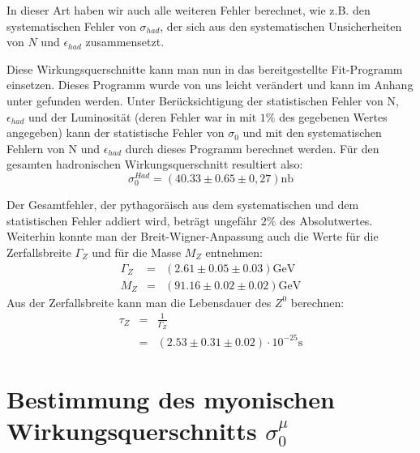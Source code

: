 In dieser Art haben wir auch alle weiteren Fehler berechnet, wie z.B. den systematischen Fehler von $\sigma_{had}$, der sich aus den systematischen Unsicherheiten von $N$ und $\epsilon_{had}$ zusammensetzt.

Diese Wirkungsquerschnitte kann man nun in das bereitgestellte Fit-Programm einsetzen. Dieses Programm wurde von uns leicht verändert und kann im Anhang unter  gefunden werden. Unter Berücksichtigung der statistischen Fehler von N, $\epsilon_{had}$ und der Luminosität (deren Fehler war in \cite[S.9]{script} mit $1\%$ des gegebenen Wertes angegeben) kann der statistische Fehler von $\sigma_0$ und mit den systematischen Fehlern von N und $\epsilon_{had}$ durch dieses Programm berechnet werden. Für den gesamten hadronischen Wirkungsquerschnitt resultiert also:
\begin{equation}
\sigma_0^{Had} = (40.33 \pm 0.65 \pm 0,27)\si{\nano\barn}
\end{equation}

Der Gesamtfehler, der pythagoräisch aus dem systematischen und dem statistischen Fehler addiert wird, beträgt ungefähr $2\%$ des Absolutwertes.\\
Weiterhin konnte man der Breit-Wigner-Anpassung auch die Werte für die Zerfallsbreite $\Gamma_Z$ und für die Masse $M_Z$ entnehmen:
\begin{eqnarray}
\Gamma_Z &=& (2.61 \pm 0.05 \pm 0.03)\si{\giga\electronvolt}\\
M_Z &=& (91.16 \pm 0.02 \pm 0.02)\si{\giga\electronvolt}
\end{eqnarray}
Aus der Zerfallsbreite kann man die Lebensdauer des $Z^0$ berechnen:
\begin{eqnarray}
\tau_Z &=& \frac{1}{\Gamma_Z}\\
&=& (2.53 \pm 0.31 \pm 0.02)\cdot 10^{-25}\si{\second}
\end{eqnarray}

\section{Bestimmung des myonischen Wirkungsquerschnitts $\sigma_0^{\mu}$}
